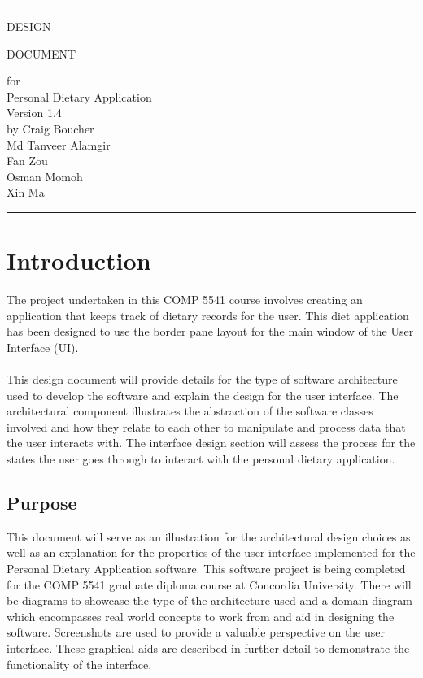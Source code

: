 \documentclass{scrreprt}
\date{}
\def\myversion{1.4}
\begin{document}
\begin{titlepage}
  \flushright\bfseries\huge
    \rule{\linewidth}{5pt}
    \par
    \vspace{1cm}
    {\Huge DESIGN \par DOCUMENT \par}
    \vspace{2cm}
    for \\
    \vspace{2cm}
    Personal Dietary Application \\
    \vspace{2cm}
     \LARGE{Version \myversion \\}
    \vspace{2cm}
    by Craig Boucher \\
    Md Tanveer Alamgir \\
    Fan Zou\\
    Osman Momoh \\
    Xin Ma
    \vspace{2cm}
    \rule{\linewidth}{5pt}
\end{titlepage}
\tableofcontents
\chapter{Introduction}
The project undertaken in this COMP 5541 course involves creating an application that keeps track of dietary records for the user. This diet application has been designed to use the border pane layout for the main window of the User Interface (UI). \\ \\ 
This design document will provide details for the type of software architecture used to develop the software and explain the design for the user interface. The architectural component illustrates the abstraction of the software classes involved and how they relate to each other to manipulate and process data that the user interacts with. The interface design section will assess the process for the states the user goes through to interact with the personal dietary application.
\section{Purpose}
This document will serve as an illustration for the architectural design choices as well as an explanation for the properties of the user interface implemented for the Personal Dietary Application software. This software project is being completed for the COMP 5541 graduate diploma course at Concordia University. There will be diagrams to showcase the type of the architecture used and a domain diagram which encompasses real world concepts to work from and aid in designing the software. Screenshots are used to provide a valuable perspective on the user interface. These graphical aids are described in further detail to demonstrate the functionality of the interface.
\end{document}
